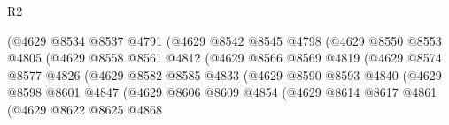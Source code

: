 \begin{lexlean}{R2}
\begin{coremodule}
                                    (@4629
                                      @8534
                                      @8537
                                      @4791
                                      (@4629
                                        @8542
                                        @8545
                                        @4798
                                        (@4629
                                          @8550
                                          @8553
                                          @4805
                                          (@4629
                                            @8558
                                            @8561
                                            @4812
                                            (@4629
                                              @8566
                                              @8569
                                              @4819
                                              (@4629
                                                @8574
                                                @8577
                                                @4826
                                                (@4629
                                                  @8582
                                                  @8585
                                                  @4833
                                                  (@4629
                                                    @8590
                                                    @8593
                                                    @4840
                                                    (@4629
                                                      @8598
                                                      @8601
                                                      @4847
                                                      (@4629
                                                        @8606
                                                        @8609
                                                        @4854
                                                        (@4629
                                                          @8614
                                                          @8617
                                                          @4861
                                                          (@4629
                                                            @8622
                                                            @8625
                                                            @4868

\end{coremodule}
\end{lexlean}
